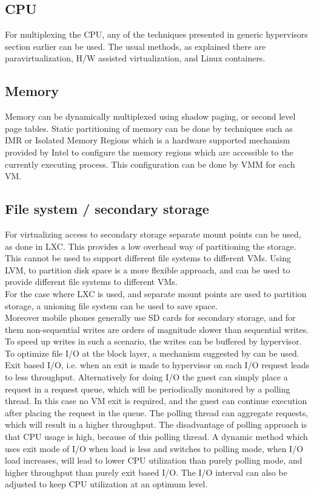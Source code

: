 \documentclass[seminar,twoside]{iitbreport}
\begin{document}
 \subsection*{CPU}
 For multiplexing the CPU, any of the techniques presented in generic hypervisors section earlier can be used. The usual methods, as explained there are paravirtualization,
 H/W assisted virtualization, and Linux containers.
 \subsection*{Memory}
 Memory can be dynamically multiplexed using shadow paging, or second level page tables.
 Static partitioning of memory can be done by techniques such as IMR or Isolated Memory Regions which is a hardware supported mechanism provided by Intel to configure
 the memory regions which are accessible to the currently executing process. This configuration can be done by VMM for each VM.
 
 \subsection*{File system / secondary storage}
 For virtualizing access to secondary storage separate mount points can be used, as done in LXC. This provides a low overhead way of partitioning the storage.
 This cannot be used to support different file systems to different VMs. Using LVM, to partition disk space is a more flexible approach, and can be used to provide different file
 systems to different VMs.
 \\
 For the case where LXC is used, and separate mount points are used to partition storage, a unioning file system can be used to save space.
 \\Moreover mobile phones generally use SD cards for secondary storage, and for them non-sequential writes are orders of magnitude slower than sequential writes. To speed up
 writes in such a scenario, the writes can be buffered by hypervisor.
\\
To optimize file I/O at the block layer, a mechanism suggested by\cite{Lee:2015:PHB:2701126.2701228} can be used. Exit based I/O, i.e. when an exit is made to hypervisor
on each I/O request leads to less throughput. Alternatively for doing I/O the guest can simply place a request in a request queue, which will be periodically monitored 
by a polling thread. In this case no VM exit is required, and the guest can continue execution after placing the request in the queue. The polling thread can  
aggregate requests, which will result in a higher throughput. The disadvantage of polling approach is that CPU usage is high, because of this polling thread. A dynamic method
which uses exit mode of I/O when load is less and switches to polling mode, when I/O load increases, will lead to lower CPU utilization than purely polling mode, and 
higher throughput than purely exit based I/O. The I/O interval can also be adjusted to keep CPU utilization at an optimum level.
\end{document}

